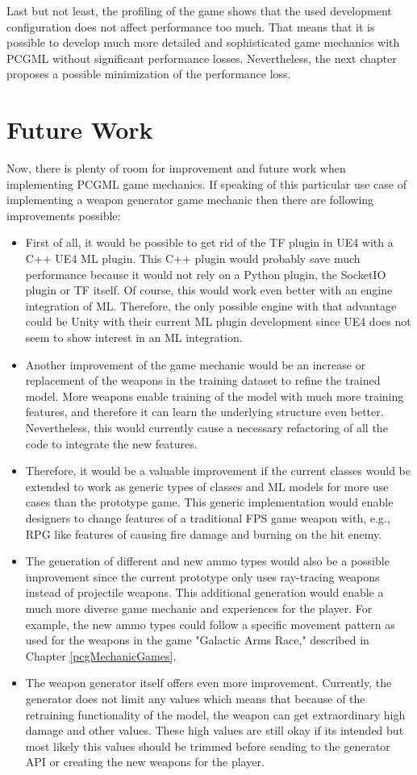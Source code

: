\documentclass[MGS,Master,english]{twbook}%
\begin{document}
Last but not least, the profiling of the game shows that the used development configuration does not affect performance too much. That means that it is possible to develop much more detailed and sophisticated game mechanics with PCGML without significant performance losses. Nevertheless, the next chapter proposes a possible minimization of the performance loss.

\section{Future Work}
Now, there is plenty of room for improvement and future work when implementing PCGML game mechanics. If speaking of this particular use case of implementing a weapon generator game mechanic then there are following improvements possible:
\begin{itemize}
	\item First of all, it would be possible to get rid of the TF plugin in UE4 with a C++ UE4 ML plugin. This C++ plugin would probably save much performance because it would not rely on a Python plugin, the SocketIO plugin or TF itself. Of course, this would work even better with an engine integration of ML. Therefore, the only possible engine with that advantage could be Unity with their current ML plugin development since UE4 does not seem to show interest in an ML integration. 
	\item Another improvement of the game mechanic would be an increase or replacement of the weapons in the training dataset to refine the trained model. More weapons enable training of the model with much more training features, and therefore it can learn the underlying structure even better. \\
	Nevertheless, this would currently cause a necessary refactoring of all the code to integrate the new features.
	\item Therefore, it would be a valuable improvement if the current classes would be extended to work as generic types of classes and ML models for more use cases than the prototype game. This generic implementation would enable designers to change features of a traditional FPS game weapon with, e.g., RPG like features of causing fire damage and burning on the hit enemy.
	\item The generation of different and new ammo types would also be a possible improvement since the current prototype only uses ray-tracing weapons instead of projectile weapons. This additional generation would enable a much more diverse game mechanic and experiences for the player. For example, the new ammo types could follow a specific movement pattern as used for the weapons in the game "Galactic Arms Race," described in Chapter \ref{pcgMechanicGames}.
	\item The weapon generator itself offers even more improvement. Currently, the generator does not limit any values which means that because of the retraining functionality of the model, the weapon can get extraordinary high damage and other values. These high values are still okay if its intended but most likely this values should be trimmed before sending to the generator API or creating the new weapons for the player.
\end{itemize}
\end{document}
